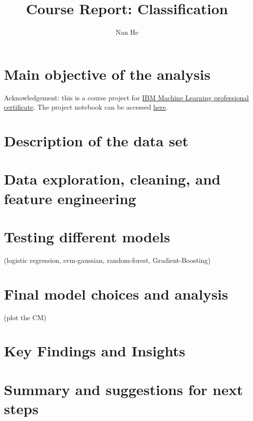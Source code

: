 \documentclass[11pt]{article}
\title{Course Report: Classification}
\author{Nan He}
\date{}
\begin{document}
\maketitle


\section{Main objective of the analysis}\label{section-introduction-1}
Acknowledgement: this is a course project for \href{https://www.coursera.org/professional-certificates/ibm-machine-learning}{IBM Machine Learning professional certificate}. The project notebook can be accessed \href{https://github.com/henankf223/Assignment-2/blob/26433c172a58e934f1039ef8de647232f05e747c/PES_DVR_pd.ipynb}{here}.

\section{Description of the data set}\label{section-introduction-2}

\section{Data exploration, cleaning, and feature engineering}\label{section-introduction-3}

\section{Testing different models}\label{section-model}
(logistic regression, svm-gaussian, random-forest, Gradient-Boosting)

\section{Final model choices and analysis}\label{section-pred}
(plot the CM)

\section{Key Findings and Insights}\label{section-find}

\section{Summary and suggestions for next steps}\label{section-sugg}

%
\end{document}
